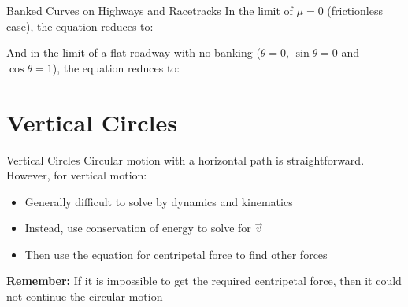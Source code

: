 \documentclass[12pt,compress,aspectratio=169]{beamer}
\begin{document}
\begin{frame}{Banked Curves on Highways and Racetracks}
  In the limit of $\mu=0$ (frictionless case), the equation reduces to:


  And in the limit of a flat roadway with no banking ($\theta=0$,
  $\sin\theta=0$ and $\cos\theta=1$), the equation reduces to:

\end{frame}




%
%


\section{Vertical Circles}

\begin{frame}{Vertical Circles}
  Circular motion with a horizontal path is straightforward. However, for
  vertical motion:
  \begin{itemize}
  \item Generally difficult to solve by dynamics and kinematics
  \item Instead, use conservation of energy to solve for $\vec v$
  \item Then use the equation for centripetal force to find other forces
  \end{itemize}

  \textbf{Remember:} If it is impossible to get the required centripetal
  force, then it could not continue the circular motion
\end{frame}
\end{document}

